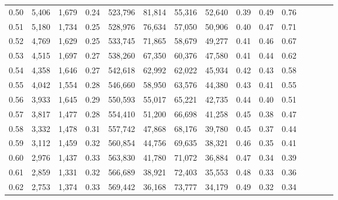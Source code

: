 \begin{tabular}{rrrcrrrrrrrrrrr}
0.50 &   5,406 &  1,679 &                                       0.24 &  523,796 &   81,814 &   55,316 &   52,640 &  0.39 &  0.49 &                         0.76 \\
0.51 &   5,180 &  1,734 &                                       0.25 &  528,976 &   76,634 &   57,050 &   50,906 &  0.40 &  0.47 &                         0.71 \\
0.52 &   4,769 &  1,629 &                                       0.25 &  533,745 &   71,865 &   58,679 &   49,277 &  0.41 &  0.46 &                         0.67 \\
0.53 &   4,515 &  1,697 &                                       0.27 &  538,260 &   67,350 &   60,376 &   47,580 &  0.41 &  0.44 &                         0.62 \\
0.54 &   4,358 &  1,646 &                                       0.27 &  542,618 &   62,992 &   62,022 &   45,934 &  0.42 &  0.43 &                         0.58 \\
0.55 &   4,042 &  1,554 &                                       0.28 &  546,660 &   58,950 &   63,576 &   44,380 &  0.43 &  0.41 &                         0.55 \\
0.56 &   3,933 &  1,645 &                                       0.29 &  550,593 &   55,017 &   65,221 &   42,735 &  0.44 &  0.40 &                         0.51 \\
0.57 &   3,817 &  1,477 &                                       0.28 &  554,410 &   51,200 &   66,698 &   41,258 &  0.45 &  0.38 &                         0.47 \\
0.58 &   3,332 &  1,478 &                                       0.31 &  557,742 &   47,868 &   68,176 &   39,780 &  0.45 &  0.37 &                         0.44 \\
0.59 &   3,112 &  1,459 &                                       0.32 &  560,854 &   44,756 &   69,635 &   38,321 &  0.46 &  0.35 &                         0.41 \\
0.60 &   2,976 &  1,437 &                                       0.33 &  563,830 &   41,780 &   71,072 &   36,884 &  0.47 &  0.34 &                         0.39 \\
0.61 &   2,859 &  1,331 &                                       0.32 &  566,689 &   38,921 &   72,403 &   35,553 &  0.48 &  0.33 &                         0.36 \\
0.62 &   2,753 &  1,374 &                                       0.33 &  569,442 &   36,168 &   73,777 &   34,179 &  0.49 &  0.32 &                         0.34 \\

\end{tabular}
